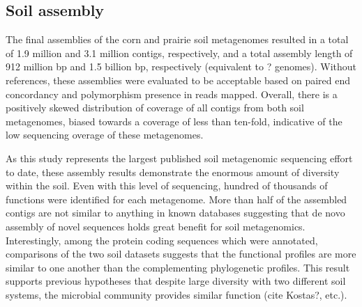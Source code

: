 \documentclass[11pt]{article} %
\begin{document}
\subsection{Soil assembly}
The final assemblies of the corn and prairie soil metagenomes resulted in a total of 1.9 million and 3.1 million contigs, respectively, and a total assembly length of 912 million bp and 1.5 billion bp, respectively (equivalent to ? genomes).  Without references, these assemblies were evaluated to be acceptable based on paired end concordancy and polymorphism presence in reads mapped.   Overall, there is a positively skewed distribution of coverage of all contigs from both soil metagenomes, biased towards a coverage of less than ten-fold, indicative of the low sequencing overage of these metagenomes.  

As this study represents the largest published soil metagenomic sequencing effort to date, these assembly results demonstrate the enormous amount of diversity within the soil.  Even with this level of sequencing, hundred of thousands of functions were identified for each metagenome.  More than half of the assembled contigs are not similar to anything in known databases suggesting that de novo assembly of novel sequences holds great benefit for soil metagenomics.  Interestingly, among the protein coding sequences which were annotated, comparisons of the two soil datasets suggests that the functional profiles are more similar to one another than the complementing phylogenetic profiles.  This result supports previous hypotheses that despite large diversity with two different soil systems, the microbial community provides similar function (cite Kostas?, etc.).  
\end{document}
